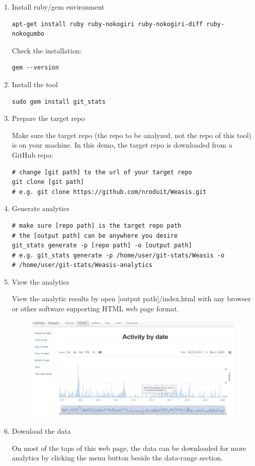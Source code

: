 \documentclass[letterpaper,cleveref]{lipics-v2019}
\begin{document}
\begin{enumerate}
\item Install ruby/gem environment
\begin{lstlisting}
apt-get install ruby ruby-nokogiri ruby-nokogiri-diff ruby-nokogumbo
\end{lstlisting}

Check the installation:
\begin{lstlisting}
gem --version
\end{lstlisting}
    
\item Install the tool
\begin{lstlisting}
sudo gem install git_stats
\end{lstlisting}
    
\item Prepare the target repo

Make sure the target repo (the repo to be analyzed, not the repo of this tool)
is on your machine.
In this demo, the target repo is downloaded from a GitHub repo:
\begin{lstlisting}
# change [git path] to the url of your target repo
git clone [git path]
# e.g. git clone https://github.com/nroduit/Weasis.git
\end{lstlisting}
    
\item Generate analytics
\begin{lstlisting}
# make sure [repo path] is the target repo path
# the [output path] can be anywhere you desire
git_stats generate -p [repo path] -o [output path]
# e.g. git_stats generate -p /home/user/git-stats/Weasis -o 
# /home/user/git-stats/Weasis-analytics
\end{lstlisting}
    
\item View the analytics

View the analytic results by open [output path]/index.html with any browser or
other software supporting HTML web page format.
\begin{figure}[h!]
\includegraphics[scale=0.4]{git-stats-demo.JPG}
\end{figure}

\item Download the data

On most of the taps of this web page, the data can be downloaded for more
analytics by clicking the menu button beside the data-range section.

\end{enumerate}
\end{document}
